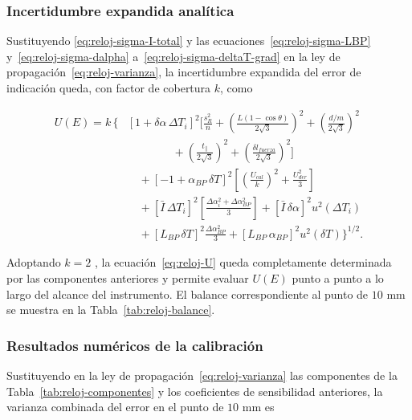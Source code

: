 \subsubsection{Incertidumbre expandida analítica}

Sustituyendo \eqref{eq:reloj-sigma-I-total} y las
ecuaciones~\eqref{eq:reloj-sigma-LBP} y~\eqref{eq:reloj-sigma-dalpha}
a~\eqref{eq:reloj-sigma-deltaT-grad} en la ley de
propagación~\eqref{eq:reloj-varianza}, la incertidumbre expandida del error de
indicación queda, con factor de cobertura $k$, como

\begin{align}
  U(E) = k \, \Bigg\{ &
  \left[1 + \delta\alpha \, \Delta T_i\right]^2
  \Bigg[ \frac{s_R^2}{n}
    + \left(\frac{L(1-\cos\theta)}{2\sqrt{3}}\right)^2
    + \left(\frac{d/m}{2\sqrt{3}}\right)^2 \nonumber \\
  &\qquad\qquad
    + \left(\frac{t_{\parallel}}{2\sqrt{3}}\right)^2
    + \left(\frac{\delta l_{fuerza}}{2\sqrt{3}}\right)^2 \Bigg] \nonumber \\
  &\quad + \left[-1 + \alpha_{BP} \, \delta T\right]^2
    \left[ \left(\frac{U_{cal}}{k}\right)^2 + \frac{U_{der}^2}{3} \right]
    \nonumber \\
  &\quad + \left[\bar{I} \, \Delta T_i\right]^2
    \left[ \frac{\Delta\alpha_i^2 + \Delta\alpha_{BP}^2}{3} \right]
    + \left[\bar{I} \, \delta\alpha\right]^2 u^2(\Delta T_i) \nonumber \\
  &\quad + \left[L_{BP} \, \delta T\right]^2
    \frac{\Delta\alpha_{BP}^2}{3}
    + \left[L_{BP} \, \alpha_{BP}\right]^2 u^2(\delta T)
  \Bigg\}^{1/2}.
  \label{eq:reloj-U}
\end{align}

Adoptando $k = 2$ \parencite{jcgm2008gum, inacal_pc014}, la
ecuación~\eqref{eq:reloj-U} queda completamente determinada por las componentes
anteriores y permite evaluar $U(E)$ punto a punto a lo largo del alcance del
instrumento. El balance correspondiente al punto de $10$ mm se muestra en la
Tabla~\ref{tab:reloj-balance}.



\subsubsection{Resultados numéricos de la calibración}
\label{sec:reloj-resultados}

Sustituyendo en la ley de propagación~\eqref{eq:reloj-varianza} las componentes de la
Tabla~\ref{tab:reloj-componentes} y los coeficientes de sensibilidad anteriores, la
varianza combinada del error en el punto de $10$ mm es

